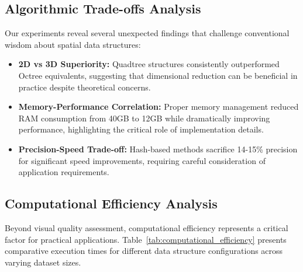 \documentclass{sbc2023}
\begin{document}
\subsection{Algorithmic Trade-offs Analysis}

Our experiments reveal several unexpected findings that challenge conventional wisdom about spatial data structures:

\begin{itemize}
    \item \textbf{2D vs 3D Superiority:} Quadtree structures consistently outperformed Octree equivalents, suggesting that dimensional reduction can be beneficial in practice despite theoretical concerns.
    \item \textbf{Memory-Performance Correlation:} Proper memory management reduced RAM consumption from 40GB to 12GB while dramatically improving performance, highlighting the critical role of implementation details.
    \item \textbf{Precision-Speed Trade-off:} Hash-based methods sacrifice 14-15\% precision for significant speed improvements, requiring careful consideration of application requirements.
\end{itemize}

\subsection{Computational Efficiency Analysis}

Beyond visual quality assessment, computational efficiency represents a critical factor for practical applications. Table~\ref{tab:computational_efficiency} presents comparative execution times for different data structure configurations across varying dataset sizes.
\end{document}
